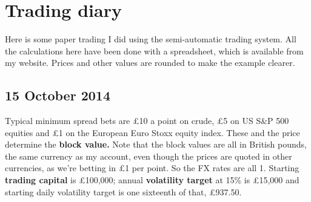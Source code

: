 \section*{Trading diary}  {}

Here is some paper trading I did using the semi-automatic trading system. All the calculations here have been done with a spreadsheet, which is available from my website. Prices and other values are rounded to make the example clearer.

\subsection*{15 October 2014}

Typical minimum spread bets are £10 a point on crude, £5 on US S\&P 500 equities and £1 on the European Euro Stoxx equity index. These and the price determine the \textbf{block value.} Note that the block values are all in British pounds, the same currency as my account, even though the prices are quoted in other currencies, as we're betting in £1 per point. So the FX rates are all 1. Starting \textbf{trading capital} is £100,000; annual \textbf{volatility target} at 15\% is £15,000 and starting daily volatility target is one sixteenth of that, £937.50.


